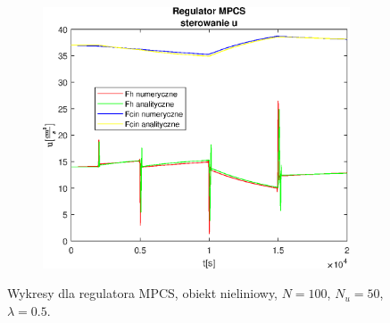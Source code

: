 \begin{figure}[h!]
   \begin{subfigure}[b]{0.4\textwidth}
      \includegraphics[width=1\linewidth]{img/MPCSnumRK/MPCSRKControlN100Nu50l50.eps}
      \caption{}
      \label{fig:fig:MPCSRKN100Nu50l503}
   \end{subfigure}
       
   \caption{Wykresy dla regulatora MPCS, obiekt nieliniowy, $N = 100$, $N_u = 50$, $\lambda = 0.5$.}
   \label{fig:MPCSRKN100Nu50l50}
\end{figure}
           
